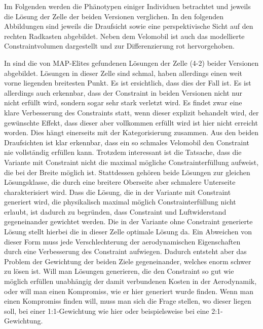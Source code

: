 
Im Folgenden werden die Phänotypen einiger Individuen betrachtet und jeweils die Lösung der Zelle der beiden Versionen verglichen.
In den folgenden Abbildungen sind jeweils die Draufsicht sowie eine perspektivische Sicht auf den rechten Radkasten abgebildet.
Neben dem Velomobil ist auch das modellierte Constraintvolumen dargestellt und zur Differenzierung rot hervorgehoben.


In  sind die von MAP-Elites gefundenen Lösungen der Zelle (4-2) beider Versionen abgebildet.
Lösungen in dieser Zelle sind schmal, haben allerdings einen weit vorne liegenden breitesten Punkt.
Es ist ersichtlich, dass dies der Fall ist.
Es ist allerdings auch erkennbar, dass der Constraint in beiden Versionen nicht nur nicht erfüllt wird, sondern sogar sehr stark verletzt wird.
Es findet zwar eine klare Verbesserung des Constraints statt, wenn dieser explizit behandelt wird, der gewünschte Effekt, dass dieser aber vollkommen erfüllt wird ist hier nicht erreicht worden.
Dies hängt einerseits mit der Kategorisierung zusammen. Aus den beiden Draufsichten ist klar erkennbar, dass ein so schmales Velomobil den Constraint nie vollständig erfüllen kann.
Trotzdem interessant ist die Tatsache, dass die Variante mit Constraint nicht die maximal mögliche Constrainterfüllung aufweist, die bei der Breite möglich ist.
Stattdessen gehören beide Lösungen zur gleichen Lösungsklasse, die durch eine breitere Oberseite aber schmalere Unterseite charakterisiert wird.
Dass die Lösung, die in der Variante mit Constraint generiert wird, die physikalisch maximal möglich Constrainterfüllung nicht erlaubt, ist dadurch zu begründen, dass Constraint und Luftwiderstand gegeneinander gewichtet werden.
Die in der Variante ohne Constraint generierte Lösung stellt hierbei die in dieser Zelle optimale Lösung da.
Ein Abweichen von dieser Form muss jede Verschlechterung der aerodynamischen Eigenschaften durch eine Verbesserung des Constraint aufwiegen.
Dadurch entsteht aber das Problem der Gewichtung der beiden Ziele gegeneinander, welches enorm schwer zu lösen ist.
Will man Lösungen generieren, die den Constraint so gut wie möglich erfüllen unabhängig der damit verbundenen Kosten in der Aerodynamik, oder will man einen Kompromiss, wie er hier generiert wurde finden.
Wenn man einen Kompromiss finden will, muss man sich die Frage stellen, wo dieser liegen soll, bei einer 1:1-Gewichtung wie hier oder beispielsweise bei eine 2:1-Gewichtung.



